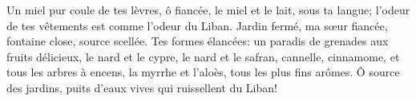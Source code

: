 Un miel pur coule de tes lèvres, ô fiancée, le miel et le lait, sous ta langue;
	l’odeur de tes vêtements est comme l’odeur du Liban.
Jardin fermé, ma sœur fiancée, fontaine close, source scellée.
Tes formes élancées: un paradis de grenades aux fruits délicieux,
	le nard et le cypre, le nard et le safran,
	cannelle, cinnamome, et tous les arbres à encens,
	la myrrhe et l’aloès, tous les plus fins arômes.
Ô source des jardins, puits d’eaux vives qui ruissellent du Liban!

